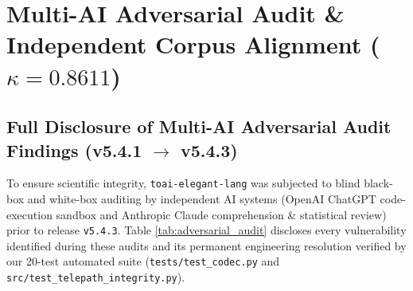\documentclass[9pt,a4paper]{extarticle}
\begin{document}
\section{Multi-AI Adversarial Audit \& Independent Corpus Alignment ($\kappa = 0.8611$)}

\subsection{Full Disclosure of Multi-AI Adversarial Audit Findings (v5.4.1 $\rightarrow$ v5.4.3)}
To ensure scientific integrity, \texttt{toai-elegant-lang} was subjected to blind black-box and white-box auditing by independent AI systems (OpenAI ChatGPT code-execution sandbox and Anthropic Claude comprehension \& statistical review) prior to release \texttt{v5.4.3}. Table \ref{tab:adversarial_audit} discloses every vulnerability identified during these audits and its permanent engineering resolution verified by our 20-test automated suite (\texttt{tests/test\_codec.py} and \texttt{src/test\_telepath\_integrity.py}).
\end{document}
